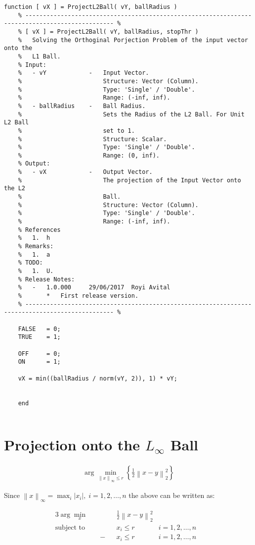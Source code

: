 \documentclass[]{article}
\newcommand{\MyBrace}[1]{\left\lbrace #1 \right\rbrace}
\newcommand{\MyNorm}[2]{{\left\| #1 \right\|}_{#2}}
\newcommand{\MyNormSqr}[2]{{\left\| #1 \right\|}_{#2}^{2}}
\newcommand{\MyNormTwoSqr}[1]{\MyNormSqr{#1}{2}}
\newcommand{\MyAbs}[1]{\left| #1 \right|}
\begin{document}
	\begin{lstlisting}[caption={MATLAB Code - $ {L}_{2} $ Ball Projection}, label={lst:codeL2Projection}]
	function [ vX ] = ProjectL2Ball( vY, ballRadius )
	% ----------------------------------------------------------------------------------------------- %
	% [ vX ] = ProjectL2Ball( vY, ballRadius, stopThr )
	%   Solving the Orthoginal Porjection Problem of the input vector onto the
	%   L1 Ball.
	% Input:
	%   - vY            -   Input Vector.
	%                       Structure: Vector (Column).
	%                       Type: 'Single' / 'Double'.
	%                       Range: (-inf, inf).
	%   - ballRadius    -   Ball Radius.
	%                       Sets the Radius of the L2 Ball. For Unit L2 Ball
	%                       set to 1.
	%                       Structure: Scalar.
	%                       Type: 'Single' / 'Double'.
	%                       Range: (0, inf).
	% Output:
	%   - vX            -   Output Vector.
	%                       The projection of the Input Vector onto the L2
	%                       Ball.
	%                       Structure: Vector (Column).
	%                       Type: 'Single' / 'Double'.
	%                       Range: (-inf, inf).
	% References
	%   1.  h
	% Remarks:
	%   1.  a
	% TODO:
	%   1.  U.
	% Release Notes:
	%   -   1.0.000     29/06/2017  Royi Avital
	%       *   First release version.
	% ----------------------------------------------------------------------------------------------- %
	
	FALSE   = 0;
	TRUE    = 1;
	
	OFF     = 0;
	ON      = 1;
	
	vX = min((ballRadius / norm(vY, 2)), 1) * vY;
	
	
	end
	
	\end{lstlisting}
	
	\section{Projection onto the $ {L}_{\infty} $ Ball}
	
	\begin{align*}
	\arg \min_{ \MyNorm{x}{\infty} \leq r } \MyBrace{ \frac{1}{2} \MyNormTwoSqr{ x - y } }
	\end{align*}
	
	Since $ \MyNorm{x}{\infty} = \max_{i} \MyAbs{ {x}_{i} }, \; i = 1, 2, \ldots, n $ the above can be written as:
	
	\begin{alignat*}{3}
	\arg \min_{x} 		& \quad && \frac{1}{2} \MyNormTwoSqr{ x - y } 	& \quad 	& \text{} \\
	\text{subject to} 	& \quad && {x}_{i} \leq r						& i = 1, 2, \ldots, n 	& \text{} \\
						& \quad -&& {x}_{i} \leq r						&  i = 1, 2, \ldots, n	& \text{}
	\end{alignat*}
	
\end{document}
